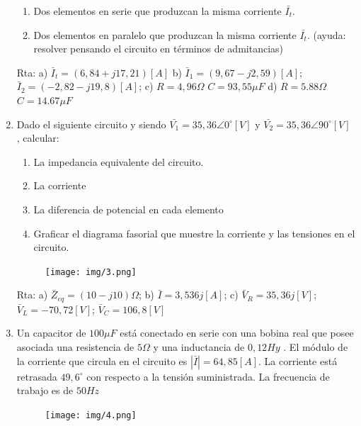 \documentclass[10pt,a4paper]{article}
\begin{document}
\begin{enumerate}
\begin{enumerate}
\item Dos elementos en serie que produzcan la misma corriente $\bar{I_t}$.

\item Dos elementos en paralelo que produzcan la misma corriente $\bar{I_t}$. (ayuda: resolver pensando el circuito en términos de admitancias)

\end{enumerate}

Rta: a) $\bar{I}_t=(6,84+j17,21)[A]$ b) $\bar{I}_1=(9,67-j2,59)[A]$; $\bar{I}_2=(-2,82-j19,8)[A]$; c) $R=4,96\Omega$ $C=93,55\mu F$ d) $R=5.88\Omega$ $C=14.67\mu F$

\item Dado el siguiente circuito y siendo $\bar{V_1}=35,36 \angle 0^{\circ}[V]$ y $\bar{V_2}=35,36 \angle 90^{\circ}[V]$ , calcular:

\begin{enumerate}
	\item La impedancia equivalente del circuito.
	\item La corriente 
	\item La diferencia de potencial en cada elemento
	\item Graficar el diagrama fasorial que muestre la corriente y las tensiones en el circuito.
\end{enumerate}

\begin{figure}[H]
	\centering
	\texttt{[image: img/3.png]}
	\label{e5}
\end{figure}

Rta: a) $\bar{Z}_{eq}=(10-j10)\Omega$; b) $\bar{I}=3,536j[A]$; c) $\bar{V}_R=35,36j[V]$; $\bar{V}_L=-70,72[V]$; $\bar{V}_C=106,8[V]$

\item Un capacitor de $100 \mu F$ está conectado en serie con una bobina real que posee asociada una resistencia de $5 \Omega$ y una inductancia de $0,12 Hy$ . El módulo de la corriente que circula en el circuito es  $|\bar{I}|=64,85 [A]$. La corriente está retrasada $49,6^{\circ}$ con respecto a la tensión suministrada. La frecuencia de trabajo es de $50 Hz$ 

\begin{figure}[H]
	\centering
	\texttt{[image: img/4.png]}
	\label{e6}
\end{figure}


\end{enumerate}
\end{document}
